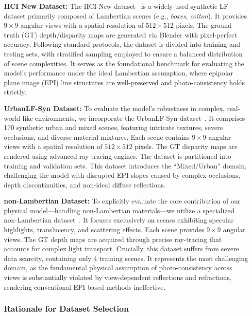 \documentclass[lettersize,journal]{IEEEtran}
\begin{document}
\textbf{HCI New Dataset:} The HCI New dataset~\cite{he2016} is a widely-used synthetic LF dataset primarily composed of Lambertian scenes (e.g., \textit{boxes}, \textit{cotton}). It provides $9 \times 9$ angular views with a spatial resolution of $512 \times 512$ pixels. The ground truth (GT) depth/disparity maps are generated via Blender with pixel-perfect accuracy. Following standard protocols, the dataset is divided into training and testing sets, with stratified sampling employed to ensure a balanced distribution of scene complexities. It serves as the foundational benchmark for evaluating the model's performance under the ideal Lambertian assumption, where epipolar plane image (EPI) line structures are well-preserved and photo-consistency holds strictly.

\textbf{UrbanLF-Syn Dataset:} To evaluate the model's robustness in complex, real-world-like environments, we incorporate the UrbanLF-Syn dataset~\cite{vaswani2017}. It comprises 170 synthetic urban and mixed scenes, featuring intricate textures, severe occlusions, and diverse material mixtures. Each scene contains $9 \times 9$ angular views with a spatial resolution of $512 \times 512$ pixels. The GT disparity maps are rendered using advanced ray-tracing engines. The dataset is partitioned into training and validation sets. This dataset introduces the ``Mixed/Urban'' domain, challenging the model with disrupted EPI slopes caused by complex occlusions, depth discontinuities, and non-ideal diffuse reflections.

\textbf{non-Lambertian Dataset:} To explicitly evaluate the core contribution of our physical model---handling non-Lambertian materials---we utilize a specialized non-Lambertian dataset~\cite{ronneberger2015}. It focuses exclusively on scenes exhibiting specular highlights, translucency, and scattering effects. Each scene provides $9 \times 9$ angular views. The GT depth maps are acquired through precise ray-tracing that accounts for complex light transport. Crucially, this dataset suffers from severe data scarcity, containing only 4 training scenes. It represents the most challenging domain, as the fundamental physical assumption of photo-consistency across views is substantially violated by view-dependent reflections and refractions, rendering conventional EPI-based methods ineffective.

\subsubsection{Rationale for Dataset Selection}
\end{document}
